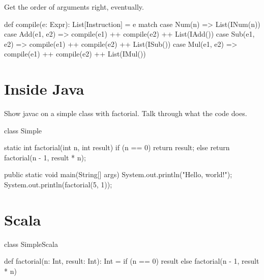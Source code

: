 \documentclass{book}
\begin{document}
Get the order of arguments right, eventually.

\begin{scalacode}
def compile(e: Expr): List[Instruction] = e match {
  case Num(n) => List(INum(n))
  case Add(e1, e2) => compile(e1) ++ compile(e2) ++ List(IAdd())
  case Sub(e1, e2) => compile(e1) ++ compile(e2) ++ List(ISub())
  case Mul(e1, e2) => compile(e1) ++ compile(e2) ++ List(IMul())
}

\end{scalacode}

\section{Inside Java}

Show javac on a simple class with factorial. Talk through what the code does.

\begin{javacode}
class Simple {

  static int factorial(int n, int result) {
    if (n == 0) {
      return result;
    }
    else {
      return factorial(n - 1, result * n);
    }
  }

  public static void main(String[] args) {
    System.out.println("Hello, world!");
     System.out.println(factorial(5, 1));
  }

}
\end{javacode}


\section{Scala}

\begin{scalacode}
class SimpleScala {

  def factorial(n: Int, result: Int): Int = {
    if (n == 0) {
      result
    }
    else {
      factorial(n - 1, result * n)
    }
  }

}
\end{scalacode}

\end{document}
